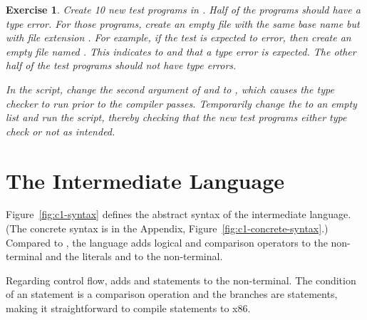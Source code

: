 \documentclass[11pt]{book}
\newtheorem{exercise}[theorem]{Exercise}
\begin{document}
\begin{exercise}\normalfont
Create 10 new test programs in \LangIf{}. Half of the programs should
have a type error. For those programs, create an empty file with the
same base name but with file extension . For example, if
the test  is expected to error, then create
an empty file named .  This indicates to
 and  that a type error is
expected. The other half of the test programs should not have type
errors.

In the  script, change the second argument of
 and  to
, which causes the type checker to run prior to
the compiler passes. Temporarily change the  to an empty
list and run the script, thereby checking that the new test programs
either type check or not as intended.
\end{exercise}


\section{The \LangCIf{} Intermediate Language}
\label{sec:Cif}

Figure~\ref{fig:c1-syntax} defines the abstract syntax of the
\LangCIf{} intermediate language. (The concrete syntax is in the
Appendix, Figure~\ref{fig:c1-concrete-syntax}.)  Compared to
\LangCVar{}, the \LangCIf{} language adds logical and comparison
operators to the \Exp{} non-terminal and the literals  and
 to the \Arg{} non-terminal.

Regarding control flow, \LangCIf{} adds  and 
statements to the \Tail{} non-terminal. The condition of an 
statement is a comparison operation and the branches are 
statements, making it straightforward to compile  statements
to x86.
\end{document}
